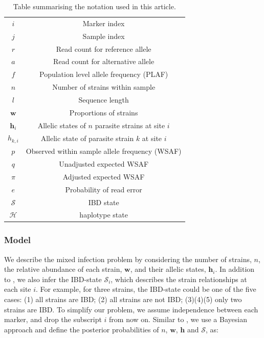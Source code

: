 \documentclass[9pt,lineno]{elife}
\begin{document}
\begin{table}[htb]\centering
\begin{tabular}{c|c}\hline
$i$              & Marker index\\
$j$              & Sample index \\
$r$              & Read count for reference allele \\
$a$              & Read count for alternative allele \\
$f$              & Population level allele frequency (PLAF) \\
$n$              & Number of strains within sample \\
$l$              & Sequence length \\
$\mathbf{w}$      & Proportions of strains \\
$\mathbf{h}_{i}$ & Allelic states of $n$ parasite strains at site $i$ \\
$h_{k,i}$   & Allelic state of parasite strain $k$ at site $i$\\
$p$              & Observed within sample allele frequency (WSAF) \\
$q$              & Unadjusted expected WSAF  \\
$\pi$            & Adjusted expected WSAF \\
$e$              & Probability of read error\\
$\mathcal{S}$ & IBD state \\
$\mathcal{H}$ & haplotype state \\
\hline
\end{tabular}
\caption{Table summarising the notation used in this article.}\label{tab:notation}
\end{table}

\subsubsection{Model}

We describe the mixed infection problem by considering the number of strains, $n$, the relative abundance of each strain, $\mathbf{w}$, and their allelic states, $\mathbf{h}_{i}$. In addition to \citet{Zhu2017}, we also infer the IBD-state $\mathcal{S}_{i}$, which describes the strain relationships at each site $i$. For example, for three strains, the IBD-state could be one of the five cases: (1) all strains are IBD; (2) all strains are not IBD; (3)(4)(5) only two strains are IBD. To simplify our problem, we assume independence between each marker, and drop the subscript $i$ from now on. Similar to \citet{Jack2016}, we use a Bayesian approach and define the posterior probabilities of $n$, $\mathbf{w}$, $\mathbf{h}$ and $\mathcal{S}$,  as:
\end{document}
